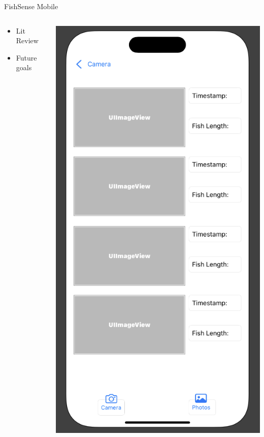 \begin{frame}{FishSense Mobile}
    \begin{columns}
        \begin{column}{0.5\textwidth}
            \begin{itemize}
                \item Lit Review
                \item Future goals
            \end{itemize} 
        \end{column}
        \begin{column}{0.5\textwidth}
            \centering
            \includegraphics[height=1\textheight,width=1\textwidth,keepaspectratio]{images/UIBackButton.png}
        \end{column}
    \end{columns}
\end{frame}

